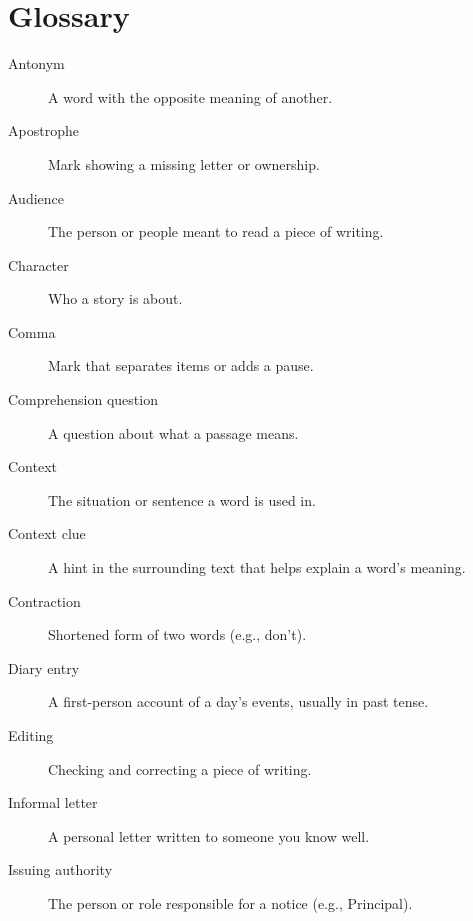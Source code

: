 
\chapter{Glossary}

\begin{description}

    \item[Antonym] A word with the opposite meaning of another.

    \item[Apostrophe] Mark showing a missing letter or ownership.

    \item[Audience] The person or people meant to read a piece of writing.

    \item[Character] Who a story is about.

    \item[Comma] Mark that separates items or adds a pause.

    \item[Comprehension question] A question about what a passage means.

    \item[Context] The situation or sentence a word is used in.

    \item[Context clue] A hint in the surrounding text that helps explain a word's meaning.

    \item[Contraction] Shortened form of two words (e.g., don't).

    \item[Diary entry] A first-person account of a day's events, usually in past tense.

    \item[Editing] Checking and correcting a piece of writing.

    \item[Informal letter] A personal letter written to someone you know well.

    \item[Issuing authority] The person or role responsible for a notice (e.g., Principal).


\end{description}
